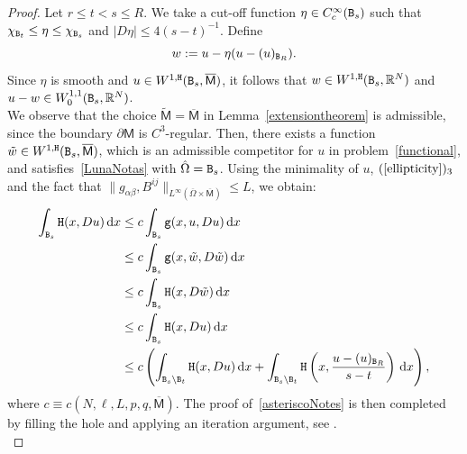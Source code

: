 \documentclass[a4paper]{amsart}
\theoremstyle{plain}  %
\numberwithin{equation}{section}
\newcommand{\mm}{\mathsf{M}}
\newcommand{\tx}[1]{\textnormal{\texttt{#1}}}
\begin{document}
\begin{proof}
Let \( r \leq t < s \leq R \). We take a cut-off function \( \eta \in C^\infty_c(\tx{B}_s) \) such that \( \chi_{\tx{B}_t} \leq \eta \leq \chi_{\tx{B}_s} \) and \( |D\eta| \leq 4(s - t)^{-1} \). Define
\[
w := u - \eta(u - (u)_{\tx{B}_R}).
\]
Since \( \eta \) is smooth and \( u \in W^{1,\tx{H}}(\tx{B}_s, \overline{\mm}) \), it follows that \( w \in W^{1,\tx{H}}(\tx{B}_s, \mathbb{R}^N) \) and \( u - w \in W^{1,1}_0(\tx{B}_s, \mathbb{R}^N) \).\\

\noindent
We observe that the choice \( \tilde{\mm} = \overline{\mm} \) in Lemma~\ref{extensiontheorem} is admissible, since the boundary \( \partial \mm \) is \( C^3 \)-regular. Then, there exists a function \( \tilde{w} \in W^{1,\tx{H}}(\tx{B}_s, \overline{\mm}) \), which is an admissible competitor for \( u \) in problem~\eqref{functional}, and satisfies~\eqref{LunaNotas} with \( \hat{\Omega} = \tx{B}_s \). Using the minimality of \( u \), $(\ref{ellipticity})_3$ and the fact that 
$ \|g_{\alpha\beta},B^{ij}\|_{L^\infty(\overline{\Omega}\times \overline{\mm})} \leq L$, we obtain:
\begin{align}\label{3.3DF}
    \int_{\tx{B}_s} \tx{H}(x, D u) \, \mathrm{d}x 
    &\leq c \int_{\tx{B}_s} \tx{g}(x,u, D u) \, \mathrm{d}x \nonumber \\
    &\leq c \int_{\tx{B}_s} \tx{g}(x,\tilde{w}, D \tilde{w}) \, \mathrm{d}x \nonumber \\
    &\leq c \int_{\tx{B}_s} \tx{H}(x, D \tilde{w}) \, \mathrm{d}x \nonumber \\
    &\leq c \int_{\tx{B}_s} \tx{H}(x, D u) \, \mathrm{d}x \nonumber \\
    &\leq c \left( \int_{\tx{B}_s \setminus \tx{B}_t} \tx{H}(x, D u) \, \mathrm{d}x + \int_{\tx{B}_s \setminus \tx{B}_t} \tx{H}\left(x, \frac{u - (u)_{\tx{B}_R}}{s - t}\right) \, \mathrm{d}x \right),
\end{align}
where \( c \equiv c(
N, \ell, L,p, q, \overline{\mm}) \).  
The proof of~\eqref{asteriscoNotes} is then completed by filling the hole and applying an iteration argument, see \cite{comi2}. \\


\end{proof}
\end{document}
